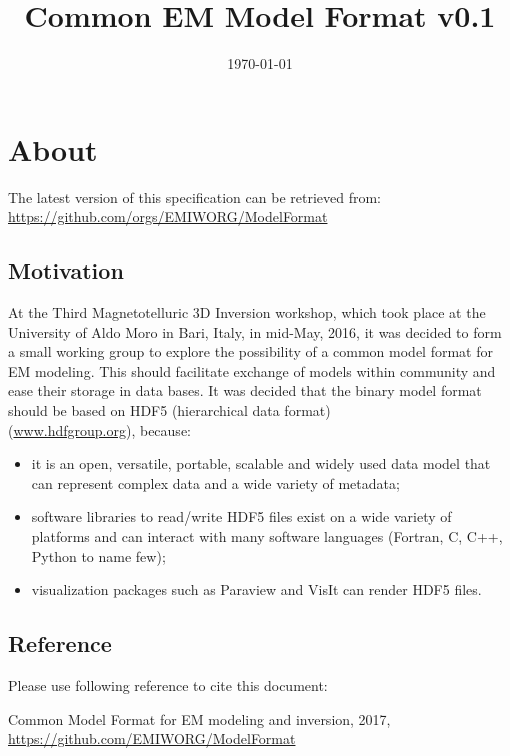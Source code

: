 \documentclass[10pt,a4paper]{article}
\title{\textbf{Common EM Model Format v0.1}} \date{\today}
\begin{document}
\maketitle
\newpage
\tableofcontents
{}
\newpage

\section{About}

The latest version of this specification can be retrieved from: \url{https://github.com/orgs/EMIWORG/ModelFormat}

\subsection{Motivation}

At the Third Magnetotelluric 3D Inversion workshop, which took place at the University of Aldo Moro in Bari, Italy, in mid-May, 2016, it was decided to form a small working group to explore the possibility of a common model format for EM modeling. This should facilitate exchange of models within community and ease their storage in data bases. It was decided that the binary model format should be based on HDF5 (hierarchical data format) \\(\textcolor[rgb]{0,0,1}{\underline{www.hdfgroup.org}}), because:

\begin{itemize}
	\item it is an open, versatile, portable, scalable and widely used data model that can represent complex data and a wide variety of metadata;
  \item software libraries to read/write HDF5 files exist on a 
wide variety of platforms and can interact with many software languages (Fortran, C, C++, Python to name few);
  \item visualization packages such as Paraview and VisIt can render HDF5 files. 
\end{itemize}

\subsection{Reference}
\label{sec:ref}

Please use following reference to cite this document:

Common Model Format for EM modeling and inversion, 2017, \url{https://github.com/EMIWORG/ModelFormat}
\end{document}
